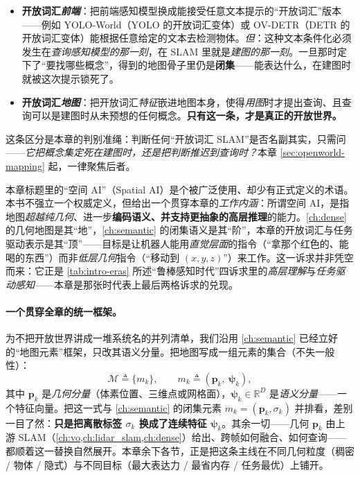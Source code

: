 \begin{itemize}
  \item \textbf{开放词汇\emph{前端}}：把前端感知模型换成能接受任意文本提示的“开放词汇”版本——例如 YOLO-World（YOLO 的开放词汇变体）或 OV-DETR（DETR 的开放词汇变体）能根据任意给定的文本去检测物体。\emph{但}：这种文本条件化必须发生在\emph{查询感知模型的那一刻}，在 SLAM 里就是\emph{建图的那一刻}。一旦那时定下了“要找哪些概念”，得到的地图骨子里仍是\textbf{闭集}——能表达什么，在建图时就被这次提示锁死了。
  \item \textbf{开放词汇\emph{地图}}：把开放词汇\emph{特征}嵌进地图本身，使得\emph{用图}时才提出查询、且查询可以是建图时从未预想的任何概念。\textbf{只有这一条，才是真正的开放世界。}
\end{itemize}

\noindent 这条区分是本章的判别准绳：判断任何“开放词汇 SLAM”是否名副其实，只需问——\emph{它把概念集定死在建图时，还是把判断推迟到查询时？}本章 \cref{sec:openworld-mapping} 起，一律聚焦后者。

\begin{note}[“空间 AI”：本书的工作定义]
本章标题里的“空间 AI”（Spatial AI）是个被广泛使用、却少有正式定义的术语。本书不强立一个权威定义，但给出一个贯穿本章的\emph{工作内涵}：所谓空间 AI，是指地图\emph{超越纯几何}、进一步\textbf{编码语义、并支持更抽象的高层推理}的能力\cite{paull2026openworld}。\cref{ch:dense} 的几何地图是其“地”，\cref{ch:semantic} 的闭集语义是其“阶”，本章的开放词汇与任务驱动表示是其“顶”——目标是让机器人能用\emph{直觉层面}的指令（“拿那个红色的、能喝的东西”）而非\emph{低层几何}指令（“移动到 $(x,y,z)$”）来工作。这一诉求并非凭空而来：它正是 \cref{tab:intro-eras} 所述“鲁棒感知时代”四诉求里的\emph{高层理解}与\emph{任务驱动感知}——本章是那张时代表上最后两格诉求的兑现。
\end{note}

\paragraph{一个贯穿全章的统一框架。}
为不把开放世界讲成一堆系统名的并列清单，我们沿用 \cref{ch:semantic} 已经立好的“地图元素”框架，只改其语义分量。把地图写成一组元素的集合（不失一般性）：
\begin{equation}
  \mathcal{M}\triangleq\{m_k\},\qquad m_k\triangleq(\mathbf{p}_k,\ \boldsymbol\psi_k),
  \label{eq:ow-mapelem}
\end{equation}
其中 $\mathbf{p}_k$ 是\emph{几何分量}（体素位置、三维点或网格面），$\boldsymbol\psi_k\in\mathbb{R}^{D}$ 是\emph{语义分量}——一个特征向量。把这一式与 \cref{ch:semantic} 的闭集元素 $m_k=(\mathbf{p}_k,\sigma_k)$ 并排看，差别一目了然：\textbf{只是把离散标签 $\sigma_k$ 换成了连续特征 $\boldsymbol\psi_k$}。其余一切——几何 $\mathbf{p}_k$ 由上游 SLAM（\cref{ch:vo,ch:lidar_slam,ch:dense}）给出、跨帧如何融合、如何查询——都顺着这一替换自然展开。本章余下各节，正是把这条主线在不同几何粒度（稠密 / 物体 / 隐式）与不同目标（最大表达力 / 最省内存 / 任务最优）上铺开。

